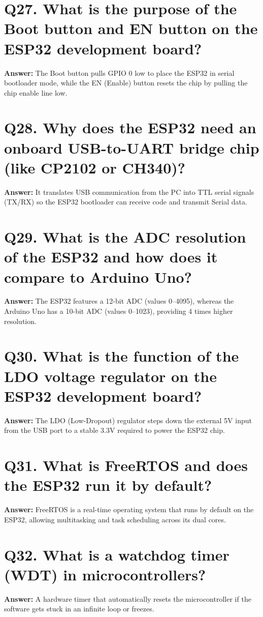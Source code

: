 \documentclass[12pt,a4paper,oneside]{report}
\begin{document}
\section{Q27. What is the purpose of the Boot button and EN button on the ESP32 development board?}
\textbf{Answer:} The Boot button pulls GPIO 0 low to place the ESP32 in serial bootloader mode, while the EN (Enable) button resets the chip by pulling the chip enable line low.

\section{Q28. Why does the ESP32 need an onboard USB-to-UART bridge chip (like CP2102 or CH340)?}
\textbf{Answer:} It translates USB communication from the PC into TTL serial signals (TX/RX) so the ESP32 bootloader can receive code and transmit Serial data.

\section{Q29. What is the ADC resolution of the ESP32 and how does it compare to Arduino Uno?}
\textbf{Answer:} The ESP32 features a 12-bit ADC (values 0--4095), whereas the Arduino Uno has a 10-bit ADC (values 0--1023), providing 4 times higher resolution.

\section{Q30. What is the function of the LDO voltage regulator on the ESP32 development board?}
\textbf{Answer:} The LDO (Low-Dropout) regulator steps down the external 5V input from the USB port to a stable 3.3V required to power the ESP32 chip.

\section{Q31. What is FreeRTOS and does the ESP32 run it by default?}
\textbf{Answer:} FreeRTOS is a real-time operating system that runs by default on the ESP32, allowing multitasking and task scheduling across its dual cores.

\section{Q32. What is a watchdog timer (WDT) in microcontrollers?}
\textbf{Answer:} A hardware timer that automatically resets the microcontroller if the software gets stuck in an infinite loop or freezes.
\end{document}
